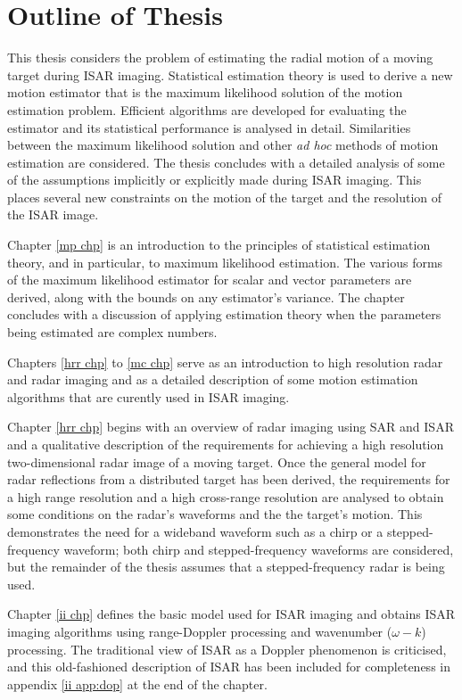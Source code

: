\section{Outline of Thesis}

This thesis considers the problem of estimating the radial motion of a
moving target during ISAR imaging.  Statistical estimation theory is used
to derive a new motion estimator that is the maximum likelihood solution of
the motion estimation problem.  Efficient algorithms are developed for
evaluating the estimator and its statistical performance is analysed in
detail.  Similarities between the maximum likelihood solution and other
{\em ad hoc\/} methods of motion estimation are considered.  The thesis
concludes with a detailed analysis of some of the assumptions implicitly or
explicitly made during ISAR imaging.  This places several new constraints
on the motion of the target and the resolution of the ISAR image.

Chapter \ref{mp chp} is an introduction to the principles of statistical
estimation theory, and in particular, to maximum likelihood estimation. The
various forms of the maximum likelihood estimator for scalar and vector
parameters are derived, along with the \CR bounds on any estimator's
variance.  The chapter concludes with a discussion of applying estimation
theory when the parameters being estimated are complex numbers.

Chapters \ref{hrr chp} to \ref{mc chp} serve as an introduction to high
resolution radar and radar imaging and as a detailed description of some
motion estimation algorithms that are curently used in ISAR imaging.

Chapter \ref{hrr chp} begins with an overview of radar imaging using SAR
and ISAR and a qualitative description of the requirements for achieving a
high resolution two-dimensional radar image of a moving target.  Once the 
general model for radar reflections from a distributed target has been
derived, the requirements for a high range resolution and a high
cross-range resolution are analysed to obtain some conditions on the
radar's waveforms and the the target's motion.  This demonstrates the need
for a wideband waveform such as a chirp or a stepped-frequency waveform;
both chirp and stepped-frequency waveforms are considered, but the
remainder of the thesis assumes that a stepped-frequency radar is being
used.

Chapter \ref{ii chp} defines the basic model used for ISAR imaging and
obtains ISAR imaging algorithms using range-Doppler processing and
wavenumber ($\omega-k$) processing.  The traditional view of ISAR as a
Doppler phenomenon is criticised, and this old-fashioned description of
ISAR has been included for completeness in appendix \ref{ii app:dop} at the
end of the chapter.

